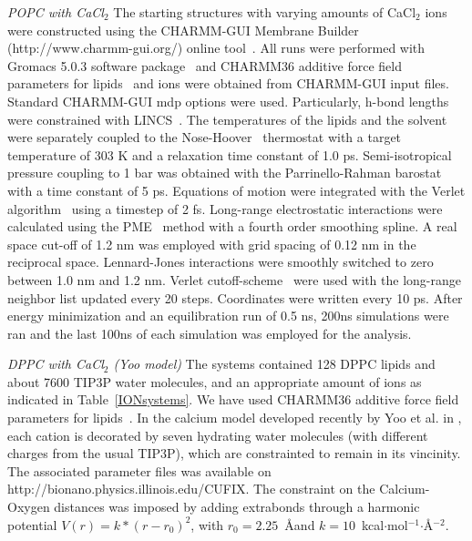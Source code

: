 \documentclass[pre,aps,floatfix,authordate1-4,twocolumn]{revtex4-1}
\begin{document}
{\it POPC with CaCl$_2$}
The starting structures with varying amounts of CaCl$_2$ ions were constructed using the CHARMM-GUI Membrane Builder (http://www.charmm-gui.org/) online tool~\cite{lee15}. 
All runs were performed with Gromacs 5.0.3 software package~\cite{abraham15} and CHARMM36 additive force field parameters for lipids~\cite{klauda10} and ions were obtained from CHARMM-GUI input files. 
Standard CHARMM-GUI mdp options were used. Particularly, h-bond lengths were constrained with LINCS~\cite{hess97,hess07}. The temperatures of the 
lipids and the solvent were separately coupled to the Nose-Hoover~\cite{nose84,hoover85} thermostat with a target temperature of 303 K and a relaxation time constant of 1.0 ps. Semi-isotropical 
pressure coupling to 1 bar was obtained with the Parrinello-Rahman barostat~\cite{parrinello81} with a time constant of 5 ps. Equations of motion were integrated with the Verlet algorithm~\cite{pall13} 
using a timestep of 2 fs. Long-range electrostatic interactions were calculated using the PME~\cite{darden93,essman95} method with a fourth order smoothing spline. A real space cut-off of 1.2 nm 
was employed with grid spacing of 0.12 nm in the reciprocal space. Lennard-Jones interactions were smoothly switched to zero between 1.0 nm and 1.2 nm. Verlet cutoff-scheme~\cite{pall13}  
were used with the long-range neighbor list updated every 20 steps. Coordinates were written every 10 ps.
After energy minimization and an equilibration run of 0.5 ns, 200ns simulations were ran and the last 100ns of each simulation was employed for the analysis.

{\it DPPC with CaCl$_2$ (Yoo model)}
The systems contained 128 DPPC lipids and about 7600 TIP3P water molecules,
and an appropriate amount of ions as indicated in  Table~\ref{IONsystems}.  
We have used CHARMM36 additive force field parameters for lipids~\cite{klauda10}. 
In the calcium model developed recently by Yoo et al. in \cite{yoo16}, 
each cation is decorated by seven hydrating water molecules (with different charges from the usual TIP3P),
which are constrainted to remain in its vincinity. The associated parameter files was available
on http://bionano.physics.illinois.edu/CUFIX. The constraint on the Calcium-Oxygen distances
was imposed by adding extrabonds through a harmonic potential $V(r) = k*(r-r_0)^2$, 
with $r_0=2.25$~\AA and $k=10$~kcal$\cdot$mol$^{-1}$$\cdot$\AA$^{-2}$.
\end{document}
